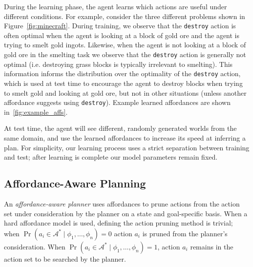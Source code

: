 \documentclass[letterpaper]{article}
\begin{document}
During the learning phase, the agent learns which actions are useful
under different conditions.  For example, consider the three different
problems shown in Figure~\ref{fig:minecraft}.  During training, we observe
that the \texttt{destroy} action is often optimal when the agent is
looking at a block of gold ore and the agent is trying to smelt gold
ingots.  Likewise, when the agent is not looking at a block of gold
ore in the smelting task we observe that the \texttt{destroy} action
is generally not optimal (i.e. destroying grass blocks is typically
irrelevant to smelting).  This information informs the distribution
over the optimality of the \texttt{destroy} action, which is used at
test time to encourage the agent to destroy blocks when trying to
smelt gold and looking at gold ore, but not in other situations
(unless another affordance suggests using \texttt{destroy}). Example
learned affordances are shown in~\ref{fig:example_affs}.

At test time, the agent will see different, randomly generated worlds
from the same domain, and use the learned affordances to increase its
speed at inferring a plan.  For simplicity, our learning process uses
a strict separation between training and test; after learning is
complete our model parameters remain fixed. 




\subsection{Affordance-Aware Planning}
\label{sec:action_pruning}
An {\em affordance-aware planner} uses affordances 
to prune actions from the action set under consideration 
by the planner on a state and
goal-specific basis. When a hard affordance model is used, defining
the action pruning method is trivial; when
$\Pr(a_i \in \mathcal{A}^*  \mid \phi_1, \ldots, \phi_n) = 0$
action $a_i$ is pruned from the planner's consideration. When
$\Pr(a_i \in \mathcal{A}^*  \mid \phi_1, \ldots, \phi_n) = 1$,
action $a_i$ remains in the action set to be searched by the planner.
\end{document}
